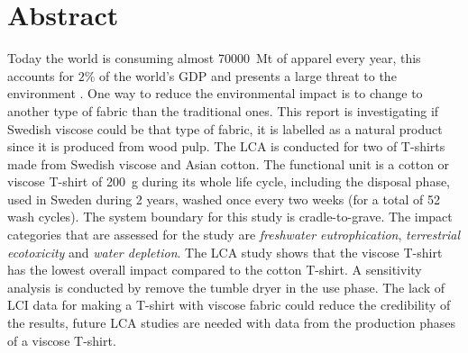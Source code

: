 \cleardoublepage %

\section*{Abstract} %
Today the world is consuming almost \SI{70000}{\mega\tonne} of apparel every year, this accounts for $2\%$ of the world’s GDP and presents a large threat to the environment \parencite{icac2013}. One way to reduce the environmental impact is to change to another type of fabric than the traditional ones. This report is investigating if Swedish viscose could be that type of fabric, it is labelled as a natural product since it is produced from wood pulp. The LCA is conducted for two of T-shirts made from Swedish viscose and Asian cotton. The functional unit is a cotton or viscose T-shirt of \SI{200}{\g} during its whole life cycle, including the disposal phase, used in Sweden during 2 years, washed once every two weeks (for a total of 52 wash cycles). The system boundary for this study is cradle-to-grave. The impact categories that are assessed for the study are \textit{freshwater eutrophication}, \textit{terrestrial ecotoxicity} and \textit{water depletion}. The LCA study shows that the viscose T-shirt has the lowest overall impact compared to the cotton T-shirt. A sensitivity analysis is conducted by remove the tumble dryer in the use phase. The lack of LCI data for making a T-shirt with viscose fabric could reduce the credibility of the results, future LCA studies are needed with data from the production phases of a viscose T-shirt.

\cleardoublepage %
